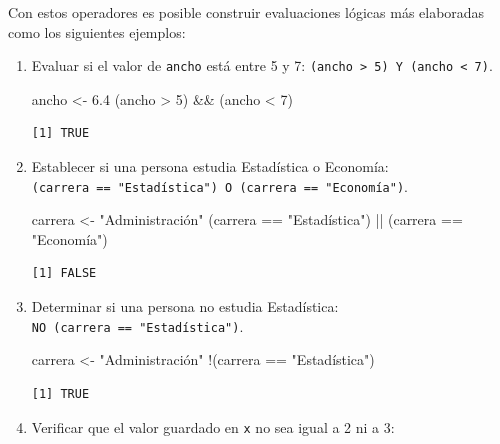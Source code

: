 \documentclass[
]{book}
\newenvironment{Shaded}{\begin{snugshade}}{\end{snugshade}}
\newcommand{\DecValTok}[1]{\textcolor[rgb]{0.00,0.00,0.81}{#1}}
\newcommand{\FloatTok}[1]{\textcolor[rgb]{0.00,0.00,0.81}{#1}}
\newcommand{\NormalTok}[1]{#1}
\newcommand{\OtherTok}[1]{\textcolor[rgb]{0.56,0.35,0.01}{#1}}
\newcommand{\SpecialCharTok}[1]{\textcolor[rgb]{0.00,0.00,0.00}{#1}}
\newcommand{\StringTok}[1]{\textcolor[rgb]{0.31,0.60,0.02}{#1}}
\begin{document}
Con estos operadores es posible construir evaluaciones lógicas más elaboradas como los siguientes ejemplos:

\begin{enumerate}
\def\labelenumi{\arabic{enumi}.}
\item
  Evaluar si el valor de \texttt{ancho} está entre 5 y 7: \texttt{(ancho\ \textgreater{}\ 5)\ Y\ (ancho\ \textless{}\ 7)}.

\begin{Shaded}
\begin{Highlighting}[]
\NormalTok{ancho }\OtherTok{\textless{}{-}} \FloatTok{6.4}
\NormalTok{(ancho }\SpecialCharTok{\textgreater{}} \DecValTok{5}\NormalTok{) }\SpecialCharTok{\&\&}\NormalTok{ (ancho }\SpecialCharTok{\textless{}} \DecValTok{7}\NormalTok{)}
\end{Highlighting}
\end{Shaded}

\begin{verbatim}
[1] TRUE
\end{verbatim}
\item
  Establecer si una persona estudia Estadística o Economía: \texttt{(carrera\ ==\ "Estadística")\ O\ (carrera\ ==\ "Economía")}.

\begin{Shaded}
\begin{Highlighting}[]
\NormalTok{carrera }\OtherTok{\textless{}{-}} \StringTok{"Administración"}
\NormalTok{(carrera }\SpecialCharTok{==} \StringTok{"Estadística"}\NormalTok{) }\SpecialCharTok{||}\NormalTok{ (carrera }\SpecialCharTok{==} \StringTok{"Economía"}\NormalTok{)}
\end{Highlighting}
\end{Shaded}

\begin{verbatim}
[1] FALSE
\end{verbatim}
\item
  Determinar si una persona no estudia Estadística: \texttt{NO\ (carrera\ ==\ "Estadística")}.

\begin{Shaded}
\begin{Highlighting}[]
\NormalTok{carrera }\OtherTok{\textless{}{-}} \StringTok{"Administración"}
\SpecialCharTok{!}\NormalTok{(carrera }\SpecialCharTok{==} \StringTok{"Estadística"}\NormalTok{)}
\end{Highlighting}
\end{Shaded}

\begin{verbatim}
[1] TRUE
\end{verbatim}
\item
  Verificar que el valor guardado en \texttt{x} no sea igual a 2 ni a 3:


\end{enumerate}
\end{document}
